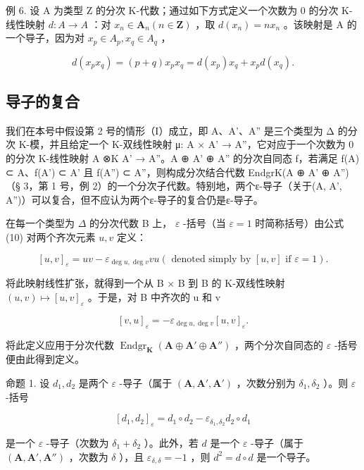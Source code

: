 例 6. 设 A 为类型 Z 的分次 K-代数；通过如下方式定义一个次数为 0 的分次 K-线性映射 \(d: A \to A\) ：对 \(x_{n} \in \mathbf{A}_{n}(n \in \mathbf{Z})\) ，取 \(d(x_{n}) = nx_{n}\) 。该映射是 A 的一个导子，因为对 \(x_{p} \in A_{p}, x_{q} \in A_{q}\) ，

\[
d (x _ {p} x _ {q}) = (p + q) x _ {p} x _ {q} = d (x _ {p}) x _ {q} + x _ {p} d (x _ {q}).
\]

\subsection{导子的复合}

我们在本号中假设第 2 号的情形（I）成立，即 A、A'、A'' 是三个类型为 Δ 的分次 K-模，并且给定一个 K-双线性映射 μ: A × A' → A''，它对应于一个次数为 0 的分次 K-线性映射 A ⊗K A' → A''。A ⊕ A' ⊕ A'' 的分次自同态 f，若满足 f(A) ⊂ A、f(A') ⊂ A' 且 f(A'') ⊂ A''，则构成分次结合代数 EndgrK(A ⊕ A' ⊕ A'')（§ 3，第 1 号，例 2）的一个分次子代数。特别地，两个ε-导子（关于(A, A', A'')）可以复合，但不应认为两个ε-导子的复合仍是ε-导子。

在每一个类型为 \(\Delta\) 的分次代数 B 上， \(\varepsilon\) -括号（当 \(\varepsilon = 1\) 时简称括号）由公式 (10) 对两个齐次元素 \(u, v\) 定义：

\[
[ u, v ] _ {\varepsilon} = u v - \varepsilon_ {\deg u, \deg v} v u (\text { denoted   simply   by } [ u, v ] \text { if } \varepsilon = 1).
\]

将此映射线性扩张，就得到一个从 B × B 到 B 的 K-双线性映射 \((u, v) \mapsto [u, v]_{\varepsilon}\) 。于是，对 B 中齐次的 u 和 v

\[
[ v, u ] _ {\varepsilon} = - \varepsilon_ {\deg u, \deg v} [ u, v ] _ {\varepsilon}.
\]

将此定义应用于分次代数 \(\operatorname{Endgr}_{\mathbf{K}}(\mathbf{A} \oplus \mathbf{A}' \oplus \mathbf{A}'')\) ，两个分次自同态的 \(\varepsilon\) -括号便由此得到定义。

命题 1. 设 \(d_1, d_2\) 是两个 \(\varepsilon\) -导子（属于 \((\mathbf{A}, \mathbf{A}', \mathbf{A} ' )\) ，次数分别为 \(\delta_1, \delta_2\) ）。则 \(\varepsilon\) -括号

\[
[ d _ {1}, d _ {2} ] _ {\varepsilon} = d _ {1} \circ d _ {2} - \varepsilon_ {\delta_ {1}, \delta_ {2}} d _ {2} \circ d _ {1}
\]

是一个 \(\varepsilon\) -导子（次数为 \(\delta_1 + \delta_2\) ）。此外，若 \(d\) 是一个 \(\varepsilon\) -导子（属于 \((\mathbf{A}, \mathbf{A}', \mathbf{A}'')\) ，次数为 \(\delta\) ），且 \(\varepsilon_{\delta, \delta} = -1\) ，则 \(d^2 = d \circ d\) 是一个导子。

